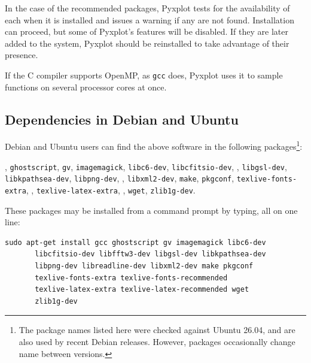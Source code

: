 \noindent In the case of the recommended packages, Pyxplot tests for the
availability of each when it is installed and issues a warning if any are not
found. Installation can proceed, but some of Pyxplot's features will be
disabled. If they are later added to the system, Pyxplot should be reinstalled
to take advantage of their presence.

If the C compiler supports OpenMP, as {\tt gcc} does, Pyxplot
uses it to sample functions on several processor cores at once.

\subsection{Dependencies in Debian and Ubuntu}

Debian and Ubuntu users can find the above software in the following
packages\footnote{The package names listed here were checked against Ubuntu
26.04, and are also used by recent Debian releases. However, packages
occasionally change name between versions.}: 

\vspace{2mm}
, {\tt ghostscript}, {\tt gv}, {\tt imagemagick}, {\tt libc6-dev}, {\tt libcfitsio-dev},\newline
{}, {\tt libgsl-dev}, {\tt libkpathsea-dev}, {\tt libpng-dev},\newline
{}, {\tt libxml2-dev}, {\tt make}, {\tt pkgconf}, {\tt texlive-fonts-extra},\newline
{}, {\tt texlive-latex-extra},\newline
{}, {\tt wget}, {\tt zlib1g-dev}.
\vspace{2mm}

\noindent These packages may be installed from a command prompt by typing, all on one line:

\begin{verbatim}
sudo apt-get install gcc ghostscript gv imagemagick libc6-dev
       libcfitsio-dev libfftw3-dev libgsl-dev libkpathsea-dev
       libpng-dev libreadline-dev libxml2-dev make pkgconf
       texlive-fonts-extra texlive-fonts-recommended
       texlive-latex-extra texlive-latex-recommended wget
       zlib1g-dev
\end{verbatim}

